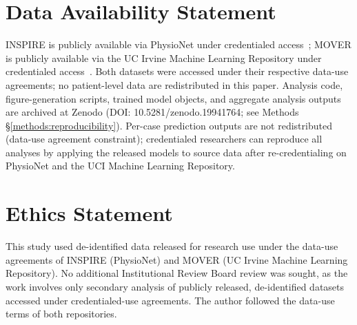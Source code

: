 \section*{Data Availability Statement}
INSPIRE is publicly available via PhysioNet under credentialed access~\cite{INSPIRE_dataset}; MOVER is publicly available via the UC Irvine Machine Learning Repository under credentialed access~\cite{MOVER_dataset}. Both datasets were accessed under their respective data-use agreements; no patient-level data are redistributed in this paper. Analysis code, figure-generation scripts, trained model objects, and aggregate analysis outputs are archived at Zenodo (DOI: 10.5281/zenodo.19941764; see Methods \S\ref{methods:reproducibility}). Per-case prediction outputs are not redistributed (data-use agreement constraint); credentialed researchers can reproduce all analyses by applying the released models to source data after re-credentialing on PhysioNet and the UCI Machine Learning Repository.

\section*{Ethics Statement}
This study used de-identified data released for research use under the data-use agreements of INSPIRE (PhysioNet) and MOVER (UC Irvine Machine Learning Repository). No additional Institutional Review Board review was sought, as the work involves only secondary analysis of publicly released, de-identified datasets accessed under credentialed-use agreements. The author followed the data-use terms of both repositories.

